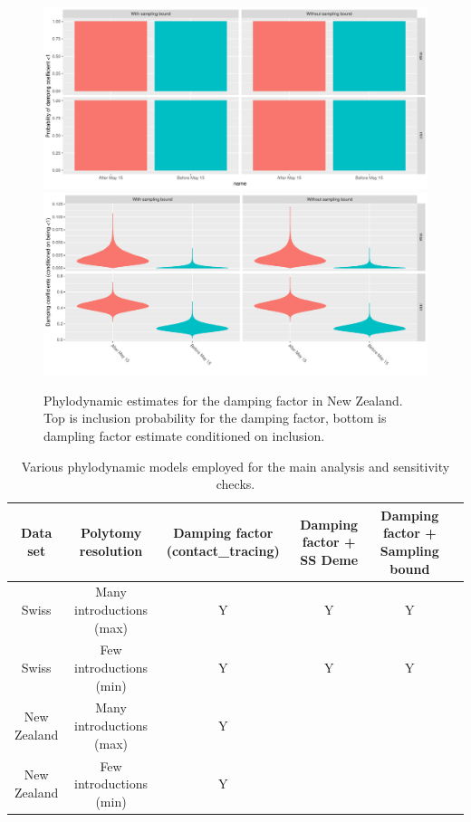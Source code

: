 \documentclass[9pt,twoside,lineno]{pnas-new}
\begin{document}
\begin{figure}[tbhp]
\centering
\includegraphics[width=\linewidth]{figures/bdsky_2021-08-18/CT_dampingProbs_NZL.pdf}
\includegraphics[width=\linewidth]{figures/bdsky_2021-08-18/CT_conditionedDamping_NZL.pdf}
\caption{Phylodynamic estimates for the damping factor in New Zealand. Top is inclusion probability for the damping factor, bottom is dampling factor estimate conditioned on inclusion.}  
\label{fig:NZLDampingFactorResults}
\end{figure}
\newpage

\begin{table}[H]
\caption{Various phylodynamic models employed for the main analysis and sensitivity checks.}
\label{tab:phylo-models}
\begin{tabular}{cccccc}
Data set & Polytomy resolution & Damping factor (contact\_tracing) & Damping factor + SS Deme & Damping factor + Sampling bound \\
\midrule
Swiss & Many introductions (max) & Y & Y & Y \\
Swiss & Few introductions (min) & Y & Y & Y \\
New Zealand & Many introductions (max) & Y & & \\
New Zealand & Few introductions (min) & Y & & \\
\bottomrule
\end{tabular}
\newline
{}
\end{table}
\end{document}
